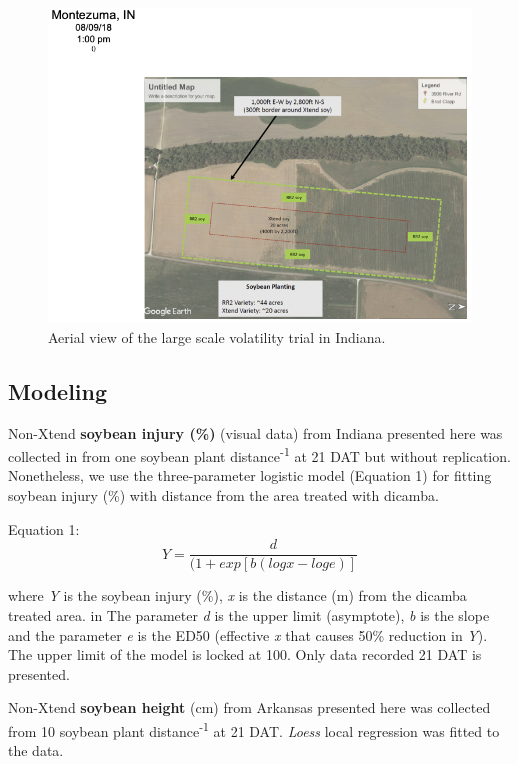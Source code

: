 \documentclass[]{article}
\begin{document}
\begin{figure}[h]

{\centering \includegraphics[width=1\linewidth]{Indiana} 

}

\caption{Aerial view of the large scale volatility trial in Indiana.}\label{fig:unnamed-chunk-25}
\end{figure}

\pagebreak
\newpage

\subsection{Modeling}\label{modeling-1}

Non-Xtend \textbf{soybean injury (\%)} (visual data) from Indiana
presented here was collected in from one soybean plant
distance\textsuperscript{-1} at 21 DAT but without replication.
Nonetheless, we use the three-parameter logistic model (Equation 1) for
fitting soybean injury (\%) with distance from the area treated with
dicamba.

Equation 1: \[Y= \frac{d}{(1 + exp[b(logx - loge)]} \]

where \emph{Y} is the soybean injury (\%), \emph{x} is the distance (m)
from the dicamba treated area. in The parameter \emph{d} is the upper
limit (asymptote), \emph{b} is the slope and the parameter \emph{e} is
the ED50 (effective \emph{x} that causes 50\% reduction in \emph{Y}).
The upper limit of the model is locked at 100. Only data recorded 21 DAT
is presented.

Non-Xtend \textbf{soybean height} (cm) from Arkansas presented here was
collected from 10 soybean plant distance\textsuperscript{-1} at 21 DAT.
\emph{Loess} local regression was fitted to the data.
\end{document}
